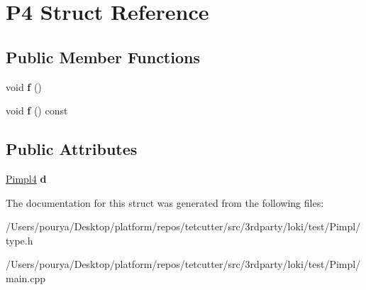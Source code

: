 \hypertarget{structP4}{}\section{P4 Struct Reference}
\label{structP4}
\subsection*{Public Member Functions}
\begin{DoxyCompactItemize}
\item 
\hypertarget{structP4_a3b674c341043879376ee03543495dc97}{}void {\bfseries f} ()\label{structP4_a3b674c341043879376ee03543495dc97}

\item 
\hypertarget{structP4_a744b922558700317032bf73c1081a473}{}void {\bfseries f} () const \label{structP4_a744b922558700317032bf73c1081a473}

\end{DoxyCompactItemize}
\subsection*{Public Attributes}
\begin{DoxyCompactItemize}
\item 
\hypertarget{structP4_a9771dd953caabc67567ebb772a6197fa}{}\hyperlink{classLoki_1_1Pimpl}{Pimpl4} {\bfseries d}\label{structP4_a9771dd953caabc67567ebb772a6197fa}

\end{DoxyCompactItemize}


The documentation for this struct was generated from the following files\+:\begin{DoxyCompactItemize}
\item 
/\+Users/pourya/\+Desktop/platform/repos/tetcutter/src/3rdparty/loki/test/\+Pimpl/type.\+h\item 
/\+Users/pourya/\+Desktop/platform/repos/tetcutter/src/3rdparty/loki/test/\+Pimpl/main.\+cpp\end{DoxyCompactItemize}
